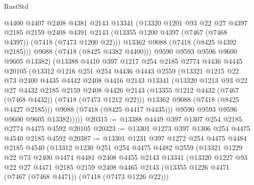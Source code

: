 \begin{lexlean}{RustStd}
\begin{coremodule}
              @4400
              @4407
              @2408
              @4381
              @2143
              @13341
              (@13320
                @1201
                @93
                @22
                @27
                @4397
                @2185
                @2159
                @2408
                @4391
                @2143
                (@13355 @1200 @4397 (@7467 (@7468 @4397)) (@7418 (@7473 @1200 @22)))
                @13362
                @9088
                (@7418 (@8425 @4392 @2185)))
              @9088
              (@7418 (@8425 @4382 @4400)))
            @9590
            @9593
            @9596
            @9600
            @9605
            @13382)
          (@13388
            @4410
            @397
            @1217
            @254
            @2185
            @2774
            @4436
            @4445
            @20105
            (@13312
              @1216
              @251
              @254
              @4436
              @4443
              @2559
              (@13321
                @1215
                @22
                @73
                @2400
                @4435
                @4442
                @2408
                @4416
                @2143
                @13341
                (@13320
                  @1213
                  @93
                  @22
                  @27
                  @4432
                  @2185
                  @2159
                  @2408
                  @4426
                  @2143
                  (@13355 @1212 @4432 (@7467 (@7468 @4432)) (@7418 (@7473 @1212 @22)))
                  @13362
                  @9088
                  (@7418 (@8425 @4427 @2185)))
                @9088
                (@7418 (@8425 @4417 @4435)))
              @9590
              @9593
              @9596
              @9600
              @9605
              @13382)))))
@20315 := @13388 @4449 @397 @1307 @254 @2185 @2774 @4475 @4592 @20105
@20323 := @13301 @1273 @397 @1306 @254 @4475 @4540 @2185 @4592
@20387 := @13301
    @1231
    @397
    @1272
    @254
    @4475
    @4484
    @2185
    @4540
    (@13312
      @1230
      @251
      @254
      @4475
      @4482
      @2559
      (@13321
        @1229
        @22
        @73
        @2400
        @4474
        @4481
        @2408
        @4455
        @2143
        @13341
        (@13320
          @1227
          @93
          @22
          @27
          @4471
          @2185
          @2159
          @2408
          @4465
          @2143
          (@13355 @1226 @4471 (@7467 (@7468 @4471)) (@7418 (@7473 @1226 @22)))

\end{coremodule}
\end{lexlean}
